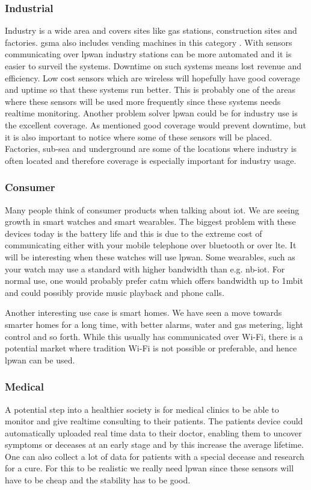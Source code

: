 \documentclass[USenglish]{ifimaster}  %
\begin{document}
\subsubsection{Industrial}
Industry is a wide area and covers sites like gas stations, construction sites and factories. \acrshort{gsma} also includes vending machines in this category \cite{online:lpwaFuture}. With sensors communicating over \acrshort{lpwan} industry stations can be more automated and it is easier to surveil the systems. Downtime on such systems means lost revenue and efficiency. Low cost sensors which are wireless will hopefully have good coverage and uptime so that these systems run better. This is probably one of the areas where these sensors will be used more frequently since these systems needs realtime monitoring. Another problem solver \acrshort{lpwan} could be for industry use is the excellent coverage. As mentioned good coverage would prevent downtime, but it is also important to notice where some of these sensors will be placed. Factories, sub-sea and underground are some of the locations where industry is often located and therefore coverage is especially important for industry usage.

\subsubsection{Consumer}
Many people think of consumer products when talking about \acrshort{iot}. We are seeing growth in smart watches and smart wearables. The biggest problem with these devices today is the battery life and this is due to the extreme cost of communicating either with your mobile telephone over bluetooth or over \acrshort{lte}. It will be interesting when these watches will use \acrshort{lpwan}. Some wearables, such as your watch may use a standard with higher bandwidth than e.g. \acrshort{nb-iot}. For normal use, one would probably prefer \acrshort{catm} which offers bandwidth up to 1\acrshort{mbit} and could possibly provide music playback and phone calls.


Another interesting use case is smart homes. We have seen a move towards smarter homes for a long time, with better alarms, water and gas metering, light control and so forth. While this usually has communicated over Wi-Fi, there is a potential market where tradition Wi-Fi is not possible or preferable, and hence \acrshort{lpwan} can be used.

\subsubsection{Medical}
A potential step into a healthier society is for medical clinics to be able to monitor and give realtime consulting to their patients. The patients device could automatically uploaded real time data to their doctor, enabling them to uncover symptoms or deceases at an early stage and by this increase the average lifetime. One can also collect a lot of data for patients with a special decease and research for a cure. For this to be realistic we really need \acrshort{lpwan} since these sensors will have to be cheap and the stability has to be good.
\end{document}
